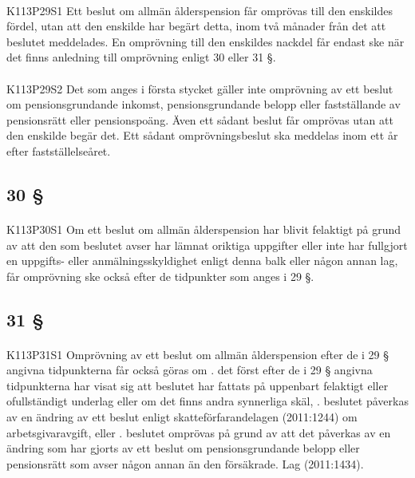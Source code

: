 \documentclass[a4paper,notitlepage,openany,10pt]{book}
\begin{document}
\paragraph*{}
{\tiny K113P29S1}
Ett beslut om allmän ålderspension får omprövas till den enskildes fördel, utan att den enskilde har begärt detta, inom två månader från det att beslutet meddelades. En omprövning till den enskildes nackdel får endast ske när det finns anledning till omprövning enligt 30 eller 31 §.
\paragraph*{}
{\tiny K113P29S2}
Det som anges i första stycket gäller inte omprövning av ett beslut om pensionsgrundande inkomst, pensionsgrundande belopp eller fastställande av pensionsrätt eller pensionspoäng. Även ett sådant beslut får omprövas utan att den enskilde begär det. Ett sådant omprövningsbeslut ska meddelas inom ett år efter fastställelseåret.
\subsection*{30 §}
\paragraph*{}
{\tiny K113P30S1}
Om ett beslut om allmän ålderspension har blivit felaktigt på grund av att den som beslutet avser har lämnat oriktiga uppgifter eller inte har fullgjort en uppgifts- eller anmälningsskyldighet enligt denna balk eller någon annan lag, får omprövning ske också efter de tidpunkter som anges i 29 §.
\subsection*{31 §}
\paragraph*{}
{\tiny K113P31S1}
Omprövning av ett beslut om allmän ålderspension efter de i 29 § angivna tidpunkterna får också göras om
. det först efter de i 29 § angivna tidpunkterna har visat sig att beslutet har fattats på uppenbart felaktigt eller ofullständigt underlag eller om det finns andra synnerliga skäl,
. beslutet påverkas av en ändring av ett beslut enligt skatteförfarandelagen (2011:1244) om arbetsgivaravgift, eller
. beslutet omprövas på grund av att det påverkas av en ändring som har gjorts av ett beslut om pensionsgrundande belopp eller pensionsrätt som avser någon annan än den försäkrade.
Lag (2011:1434).
\end{document}

